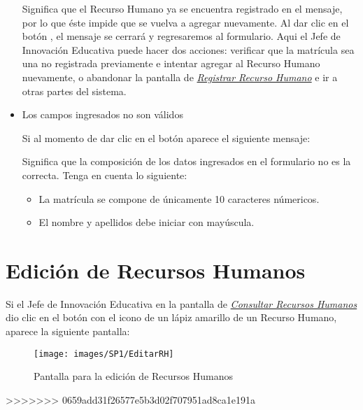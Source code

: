 \begin{itemize}
                	Significa que el Recurso Humano ya se encuentra registrado en el mensaje, por lo que éste impide que se vuelva a agregar nuevamente. Al dar clic en el botón , el mensaje se cerrará y regresaremos al formulario. Aqui el Jefe de Innovación Educativa puede hacer dos acciones: verificar que la matrícula sea una no registrada previamente e intentar agregar al Recurso Humano nuevamente, o abandonar la pantalla de \hyperlink{registrarrh}{\textit{Registrar Recurso Humano}} e ir a otras partes del sistema.
            
            	\item Los campos ingresados no son válidos
    
                	Si al momento de dar clic en el botón  aparece el siguiente mensaje:
            
                	Significa que la composición de los datos ingresados en el formulario no es la correcta. Tenga en cuenta lo siguiente:
            
                	\begin{itemize}
                		\item La matrícula se compone de únicamente 10 caracteres númericos.
                		\item El nombre y apellidos debe iniciar con mayúscula.
                	\end{itemize}
            
            \end{itemize}

\newpage
    \section{Edición de Recursos Humanos}
        Si el Jefe de Innovación Educativa en la pantalla de \hyperlink{consultarrh}{\textit{Consultar Recursos Humanos}} dio clic en el botón con el icono de un lápiz amarillo de un Recurso Humano, aparece la siguiente pantalla:
        
        \begin{figure}[!hbtp]
        	\centering
        	\hypertarget{editarrh}{\texttt{[image: images/SP1/EditarRH]}}
        	\caption{Pantalla para la edición de Recursos Humanos}
        	\label{editarrh}
        \end{figure}
>>>>>>> 0659add31f26577e5b3d02f707951ad8ca1e191a

